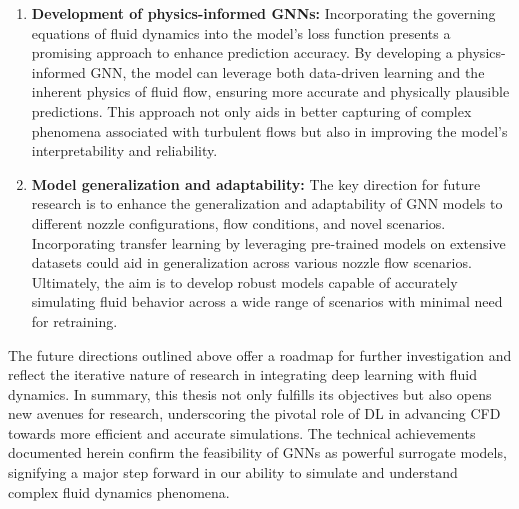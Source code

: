\begin{enumerate}
    \item \textbf{Development of physics-informed GNNs:} Incorporating the governing equations of fluid dynamics into the model's loss function presents a promising approach to enhance prediction accuracy. By developing a physics-informed GNN, the model can leverage both data-driven learning and the inherent physics of fluid flow, ensuring more accurate and physically plausible predictions. This approach not only aids in better capturing of complex phenomena associated with turbulent flows but also in improving the model's interpretability and reliability.
    \item \textbf{Model generalization and adaptability:} 
    The key direction for future research is to enhance the generalization and adaptability of GNN models to different nozzle configurations, flow conditions, and novel scenarios. Incorporating transfer learning by leveraging pre-trained models on extensive datasets could aid in generalization across various nozzle flow scenarios. Ultimately, the aim is to develop robust models capable of accurately simulating fluid behavior across a wide range of scenarios with minimal need for retraining. 

       
\end{enumerate}
The future directions outlined above offer a roadmap for further investigation and reflect the iterative nature of research in integrating deep learning with fluid dynamics. In summary, this thesis not only fulfills its objectives but also opens new avenues for research, underscoring the pivotal role of DL in advancing CFD towards more efficient and accurate simulations. The technical achievements documented herein confirm the feasibility of GNNs as powerful surrogate models, signifying a major step forward in our ability to simulate and understand complex fluid dynamics phenomena.

